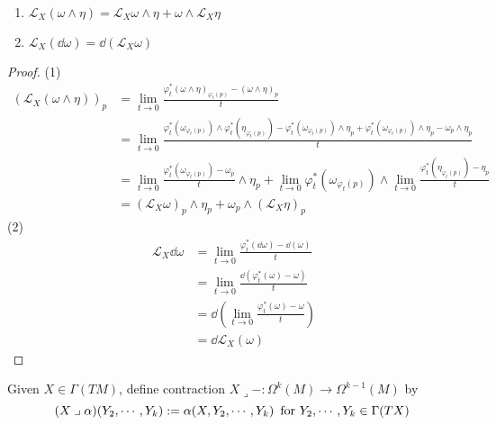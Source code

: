 \begin{lemma}
    \,
    \begin{enumerate}[label=(\arabic*)]
        \item  $ \mathcal{L}_X(\omega\wedge \eta)=\mathcal{L}_X\omega\wedge\eta+\omega\wedge\mathcal{L}_X\eta $ 
        \item  $ \mathcal{L}_X(\dd \omega)=\dd(\mathcal{L}_X\omega) $ 
    \end{enumerate}
\end{lemma}
\begin{proof}
    (1)\begin{equation}
            \begin{aligned}
                \left(\mathcal{L}_X(\omega\wedge\eta)\right)_p&=\lim_{t\to 0}\frac{\varphi_t^*(\omega\wedge\eta)_{\varphi_t(p)}-(\omega\wedge\eta)_p}{t}\\
                &=\lim_{t\to 0}\frac{\varphi_t^*(\omega_{\varphi_t(p)})\wedge\varphi_t^*(\eta_{\varphi_t(p)})-\varphi_t^*(\omega_{\varphi_t(p)})\wedge\eta_p+\varphi_t^*(\omega_{\varphi_t(p)})\wedge\eta_p-\omega_p\wedge\eta_p}{t}\\
                &=\lim_{t\to 0}\frac{\varphi_t^*(\omega_{\varphi_t(p)})-\omega_p}{t}\wedge\eta_p+\lim_{t\to 0}\varphi_t^*(\omega_{\varphi_t(p)})\wedge\lim_{t\to 0}\frac{\varphi_t^*(\eta_{\varphi_t(p)})-\eta_p}{t}\\
                &=\left(\mathcal{L}_X\omega\right)_p\wedge\eta_p+\omega_p\wedge\left(\mathcal{L}_X\eta\right)_p
            \end{aligned}
        \end{equation}
    (2)
    \begin{align*}
        \mathcal{L}_X\dd\omega&=\lim_{t\to 0}\frac{\varphi_t^*(\dd\omega)-\dd(\omega)}{t}\\
        &=\lim_{t\to 0}\frac{\dd (\varphi_t^*(\omega)-\omega)}{t}\\
        &=\dd\left(\lim_{t\to 0}\frac{\varphi_t^*(\omega)-\omega}{t}\right)\\
        &=\dd\mathcal{L}_X(\omega)
    \end{align*}
\end{proof}
Given  $ X\in \Gamma(TM) $, define contraction  $ X\mathrel{\lrcorner} -:\Omega^k(M)\rightarrow \Omega^{k-1}(M)  $ by 
    \[(X\mathrel{\lrcorner}\alpha)(Y_2,\cdots,Y_k):=\alpha(X,Y_2,\cdots,Y_k)\,\text{ for  $ Y_2,\cdots,Y_k\in \Gamma(TX) $ }\] 

